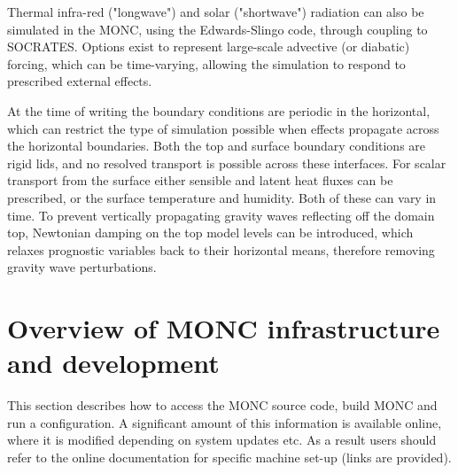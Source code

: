 \documentclass[a4paper,11pt]{article}
\begin{document}
Thermal infra-red ("longwave") and solar ("shortwave") radiation can also be
simulated in the MONC, using the Edwards-Slingo code, through coupling to SOCRATES.
Options exist to represent large-scale advective (or diabatic) forcing, which
can be time-varying, allowing the simulation to respond to prescribed external
effects.

At the time of writing the boundary conditions are periodic in the horizontal,
which can restrict the type of simulation possible when effects propagate across
the horizontal boundaries. Both the top and surface boundary conditions are
rigid lids, and no resolved transport is possible across these interfaces. For
scalar transport from the surface either sensible and latent heat fluxes can be
prescribed, or the surface temperature and humidity. Both of these can
vary in time. To prevent vertically propagating gravity waves reflecting off the domain top,
Newtonian damping on the top model levels can be introduced, which relaxes prognostic
variables back to their horizontal means, therefore removing gravity wave perturbations.

\section{Overview of MONC infrastructure and development}

This section describes how to access the MONC source code, build MONC and
run a configuration. A significant amount of this information is available online,
where it is modified depending on system updates etc. As a result users should
refer to the online documentation for specific machine set-up (links are provided).
\end{document}
